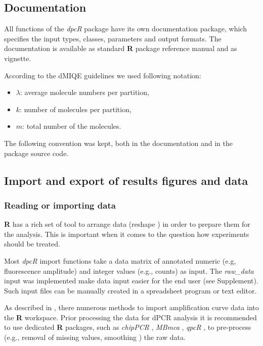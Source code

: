 \documentclass[a4,center,fleqn]{NAR}
\begin{document}
\subsection{Documentation}

All functions of the \textit{dpcR} package have its own documentation package, 
which specifies the input types, classes, parameters and output formats. The 
documentation is available as standard \textbf{R} package reference manual and 
as vignette.

According to the dMIQE guidelines \cite{huggett_digital_2013} we used following notation:

\begin{itemize}
 \item $\lambda$: average molecule numbers per partition,
 \item $k$: number of molecules per partition,
 \item $m$: total number of the molecules.
\end{itemize}

The following convention was kept, both in the documentation and in the 
package source code.

\subsection{Import and export of results figures and data}

\subsubsection{Reading or importing data}

\textbf{R} has a rich set of tool to arrange data (reshape \cite{Wickham_2007}) 
in order to prepare them for the analysis. This is important when it comes to 
the question how experiments should be treated.

Most \textit{dpcR} import functions take a data matrix of annotated numeric 
(e.g, fluorescence amplitude) and integer values (e.g., counts) as input. The 
\textit{raw\_data} input was implemented  make data input easier for the end 
user (see Supplement). Such input files can be manually created in a spreadsheet 
program or text editor.

As described in \cite{ritz_qpcr_2008, perkins_readqpcr_2012, 
pabinger_survey_2014, rodiger_r_2015}, there numerous methods to import 
amplification curve data into the \textbf{R} workspace. Prior processing the 
data for dPCR analysis it is recommended to use dedicated \textbf{R} packages, 
such as \textit{chipPCR} \cite{roediger2015chippcr}, \textit{MBmca} 
\cite{rodiger_surface_2013}, \textit{qpcR} \cite{ritz_qpcr_2008}, to pre-process 
(e.g., removal of missing values, smoothing \cite{spiess_impact_2015}) the raw 
data.
\end{document}

